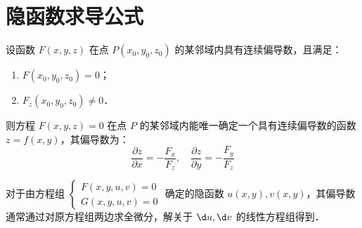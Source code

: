 \documentclass[12pt, a4paper, oneside, UTF8]{ctexbook}
\begin{document}
\section{隐函数求导公式}
\begin{theorem}[隐函数存在定理]
    设函数 $F(x, y, z)$ 在点 $P(x_0, y_0, z_0)$ 的某邻域内具有连续偏导数，且满足：
    \begin{enumerate}
        \item $F(x_0, y_0, z_0) = 0$；
        \item $F_z(x_0, y_0, z_0) \neq 0$．
    \end{enumerate}
    则方程 $F(x, y, z) = 0$ 在点 $P$ 的某邻域内能唯一确定一个具有连续偏导数的函数 $z = f(x, y)$，其偏导数为：
    \[ \frac{\partial z}{\partial x} = -\frac{F_x}{F_z}, \quad \frac{\partial z}{\partial y} = -\frac{F_y}{F_z} \]
\end{theorem}

\begin{theorem}[隐函数组情形]
    对于由方程组 $\begin{cases} F(x, y, u, v) = 0 \\ G(x, y, u, v) = 0 \end{cases}$ 确定的隐函数 $u(x, y), v(x, y)$，其偏导数通常通过对原方程组两边求全微分，解关于 $\d u, \d v$ 的线性方程组得到．
\end{theorem}
\end{document}
